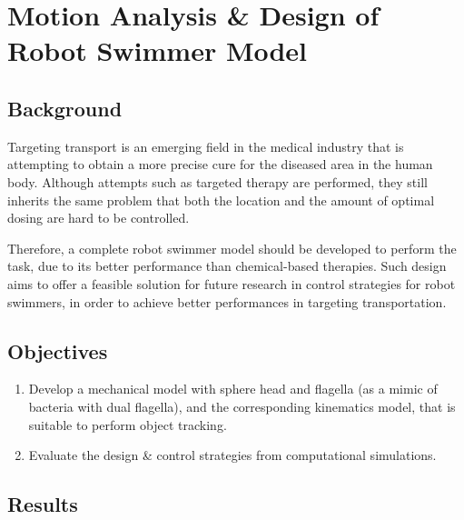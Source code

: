 \documentclass[12pt]{article}
\begin{document}
\newpage

\section{Motion Analysis \& Design of Robot Swimmer Model}


\subsection{Background}

Targeting transport is an emerging field in the medical industry that is attempting to obtain a more precise cure for the diseased area in the human body. Although attempts such as targeted therapy are performed, they still inherits the same problem that both the location and the amount of optimal dosing are hard to be controlled. 

Therefore, a complete robot swimmer model should be developed to perform the task, due to its better performance than chemical-based therapies. Such design aims to offer a feasible solution for future research in control strategies for robot swimmers, in order to achieve better performances in targeting transportation. 


\subsection{Objectives}

\begin{enumerate}
    
    \item {Develop a mechanical model with sphere head and flagella (as a mimic of bacteria with dual flagella), and the corresponding kinematics model, that is suitable to perform object tracking.}
    \item {Evaluate the design \& control strategies from computational simulations. }
    
\end{enumerate}

\subsection{Results}
\end{document}
